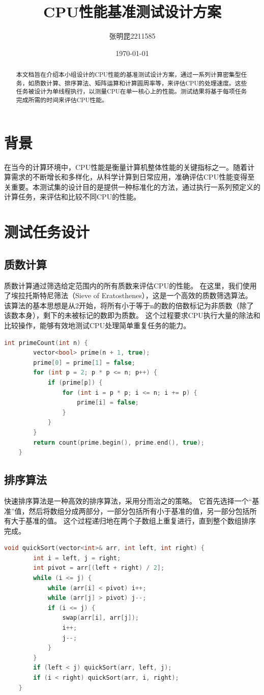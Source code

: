 \documentclass{ctexart}
\title{CPU性能基准测试设计方案}
\author{张明昆2211585}
\date{\today}
\begin{document}
\maketitle

\begin{abstract}
本文档旨在介绍本小组设计的CPU性能的基准测试设计方案，通过一系列计算密集型任务，如质数计算、排序算法、矩阵运算和计算圆周率等，来评估CPU的处理速度。这些任务被设计为单线程执行，以测量CPU在单一核心上的性能。测试结果将基于每项任务完成所需的时间来评估CPU性能。
\end{abstract}

\section{背景}
在当今的计算环境中，CPU性能是衡量计算机整体性能的关键指标之一。随着计算需求的不断增长和多样化，从科学计算到日常应用，准确评估CPU性能变得至关重要。本测试集的设计目的是提供一种标准化的方法，通过执行一系列预定义的计算任务，来评估和比较不同CPU的性能。

\section{测试任务设计}
\subsection{质数计算}
质数计算通过筛选给定范围内的所有质数来评估CPU的性能。
在这里，我们使用了埃拉托斯特尼筛法（Sieve of Eratosthenes），这是一个高效的质数筛选算法。
该算法的基本思想是从2开始，将所有小于等于n的数的倍数标记为非质数（除了该数本身），剩下的未被标记的数即为质数。
这个过程要求CPU执行大量的除法和比较操作，能够有效地测试CPU处理简单重复任务的能力。
\begin{lstlisting}[language=C++]
    int primeCount(int n) {
        vector<bool> prime(n + 1, true);
        prime[0] = prime[1] = false;
        for (int p = 2; p * p <= n; p++) {
            if (prime[p]) {
                for (int i = p * p; i <= n; i += p) {
                    prime[i] = false;
                }
            }
        }
        return count(prime.begin(), prime.end(), true);
    }
\end{lstlisting}
\subsection{排序算法}
快速排序算法是一种高效的排序算法，采用分而治之的策略。
它首先选择一个“基准”值，然后将数组分成两部分，一部分包括所有小于基准的值，另一部分包括所有大于基准的值。
这个过程递归地在两个子数组上重复进行，直到整个数组排序完成。
\begin{lstlisting}[language=C++]
    void quickSort(vector<int>& arr, int left, int right) {
        int i = left, j = right;
        int pivot = arr[(left + right) / 2];
        while (i <= j) {
            while (arr[i] < pivot) i++;
            while (arr[j] > pivot) j--;
            if (i <= j) {
                swap(arr[i], arr[j]);
                i++;
                j--;
            }
        }
        if (left < j) quickSort(arr, left, j);
        if (i < right) quickSort(arr, i, right);
    }
\end{lstlisting}
\end{document}
